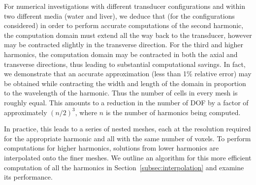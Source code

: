 \documentclass[preprint]{JASA}
\begin{document}
For numerical investigations with different transducer configurations and within 
two different media (water and liver), we deduce that (for the configurations 
considered) in order to perform accurate computations of the second harmonic, the computation 
domain must extend all the way back to the transducer, however may be contracted 
slightly in the transverse direction. For the third and higher harmonics, the 
computation domain may be contracted in both the axial and transverse directions, 
thus leading to substantial computational savings. In fact, we demonstrate that 
an accurate approximation (less than 1\% relative error) may be obtained while 
contracting the width and length
of the domain in proportion to the wavelength of the harmonic. Thus the number
of cells in every mesh is roughly equal. This amounts to a reduction in 
the number of DOF by a factor of approximately $(n/2)^3$, where $n$ is the number of harmonics 
being computed.

In practice, this leads to a series of nested meshes, each at the resolution
required for the appropriate harmonic and all with the same number of voxels.
To perform computations for higher harmonics, solutions from lower harmonics are 
interpolated onto the finer meshes. We outline an algorithm for this more 
efficient computation of all the harmonics in Section~\ref{subsec:interpolation}
and examine its performance.
\end{document}
